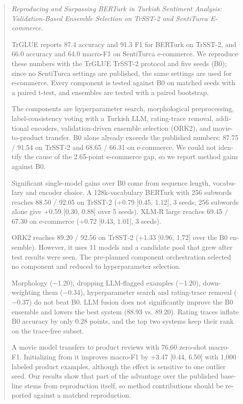 \documentclass[11pt]{article}
\begin{document}
\begin{otherlanguage}{english}\begin{abstract}

\noindent\textit{Reproducing and Surpassing BERTurk in Turkish Sentiment Analysis: Validation-Based Ensemble Selection on TrSST-2 and SentiTurca E-commerce.}\par\smallskip

TrGLUE reports 87.4 accuracy and 91.3 F1 for BERTurk on TrSST-2, and 66.0 accuracy and 64.0 macro-F1 on SentiTurca e-commerce. We reproduce these numbers with the TrGLUE TrSST-2 protocol and five seeds (B0); since no SentiTurca settings are published, the same settings are used for e-commerce. Every component is tested against B0 on matched seeds with a paired t-test, and ensembles are tested with a paired bootstrap.

The components are hyperparameter search, morphological preprocessing, label-consistency voting with a Turkish LLM, rating-trace removal, additional encoders, validation-driven ensemble selection (ORK2), and movie-to-product transfer. B0 alone already exceeds the published numbers: 87.75 / 91.54 on TrSST-2 and 68.65 / 66.31 on e-commerce. We could not identify the cause of the 2.65-point e-commerce gap, so we report method gains against B0.

Significant single-model gains over B0 come from sequence length, vocabulary and encoder choice. A 128k-vocabulary BERTurk with 256 subwords reaches 88.50 / 92.05 on TrSST-2 (+0.79 [0.45, 1.12], 3 seeds; 256 subwords alone give +0.59 [0.30, 0.88] over 5 seeds). XLM-R large reaches 69.45 / 67.30 on e-commerce (+0.72 [0.43, 1.01], 3 seeds).

ORK2 reaches 89.20 / 92.56 on TrSST-2 (+1.33 [0.96, 1.72] over the B0 ensemble). However, it uses 11 models and a candidate pool that grew after test results were seen. The pre-planned component orchestration selected no component and reduced to hyperparameter selection.

Morphology ($-$1.20), dropping LLM-flagged examples ($-$1.20), down-weighting them ($-$0.34), hyperparameter search and rating-trace removal ($-$0.37) do not beat B0. LLM fusion does not significantly improve the B0 ensemble and lowers the best system (88.93 vs. 89.20). Rating traces inflate B0 accuracy by only 0.28 points, and the top two systems keep their rank on the trace-free subset.

A movie model transfers to product reviews with 76.60 zero-shot macro-F1. Initializing from it improves macro-F1 by +3.47 [0.44, 6.50] with 1,000 labeled product examples, although the effect is sensitive to one outlier seed. Our results show that part of the advantage over the published baseline stems from reproduction itself, so method contributions should be reported against a matched reproduction.


\end{abstract}
\end{otherlanguage}
\end{document}
